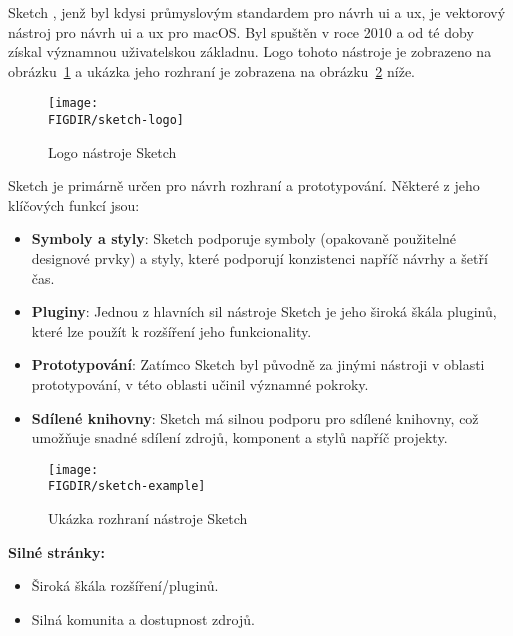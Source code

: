 \begin{subsection}{Sketch}
    \label{subsec:navrh-ui-nastroje-sketch}
    , jenž byl kdysi průmyslovým standardem pro návrh \ac{ui} a \ac{ux}, je vektorový nástroj pro návrh \ac{ui} a \ac{ux} pro macOS\@.
    Byl spuštěn v roce 2010 a od té doby získal významnou uživatelskou základnu\cite{w_industry_the_ultimate_battle_figma_vs_sketch_vs_adobe_xd}.
    Logo tohoto nástroje je zobrazeno na obrázku~\ref{fig:sketch-logo} a ukázka jeho rozhraní je zobrazena na obrázku~\ref{fig:sketch-example} níže.

    \begin{figure}[H]
        \centering
        \caption{Logo nástroje Sketch}
        \texttt{[image: \\FIGDIR/sketch-logo]}
        \label{fig:sketch-logo}
    \end{figure}

    Sketch je primárně určen pro návrh rozhraní a prototypování.
    Některé z jeho klíčových funkcí jsou:

    \begin{itemize}
        \item \textbf{Symboly a styly}: Sketch podporuje symboly (opakovaně použitelné designové prvky) a styly, které podporují konzistenci napříč návrhy a šetří čas.
        \item \textbf{Pluginy}: Jednou z hlavních sil nástroje Sketch je jeho široká škála pluginů, které lze použít k rozšíření jeho funkcionality.
        \item \textbf{Prototypování}: Zatímco Sketch byl původně za jinými nástroji v oblasti prototypování, v této oblasti učinil významné pokroky.
        \item \textbf{Sdílené knihovny}: Sketch má silnou podporu pro sdílené knihovny, což umožňuje snadné sdílení zdrojů, komponent a stylů napříč projekty.
    \end{itemize}

    \begin{figure}[H]
        \centering
        \caption{Ukázka rozhraní nástroje Sketch}
        \texttt{[image: \\FIGDIR/sketch-example]}
        \label{fig:sketch-example}
    \end{figure}

    \textbf{Silné stránky:}
    \begin{itemize}
        \item Široká škála rozšíření/pluginů.
        \item Silná komunita a dostupnost zdrojů.
    \end{itemize}


\end{subsection}
